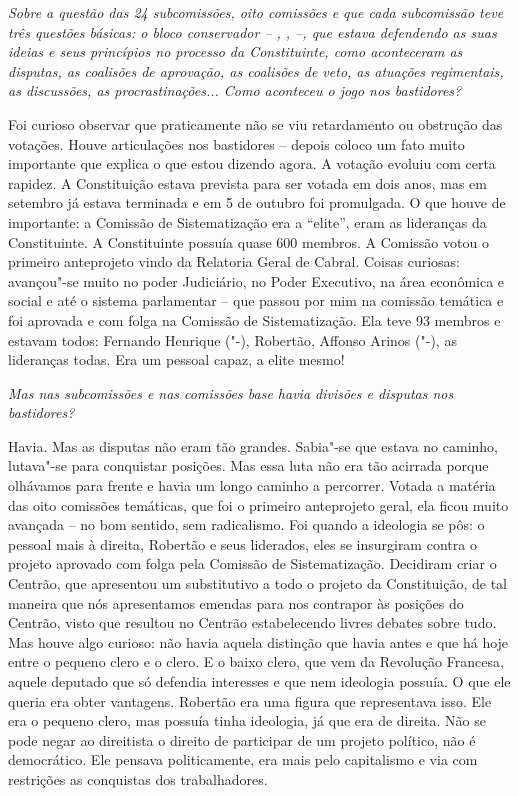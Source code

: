\medskip

\noindent\emph{Sobre a questão das 24 subcomissões, oito comissões e que cada
subcomissão teve três questões básicas: o bloco conservador -- , ,
 --, que estava defendendo as suas ideias e seus princípios no
processo da Constituinte, como aconteceram as disputas, as coalisões de
aprovação, as coalisões de veto, as atuações regimentais, as discussões,
as procrastinações... Como aconteceu o jogo nos bastidores?}

Foi curioso observar que praticamente não se viu
retardamento ou obstrução das votações. Houve articulações nos
bastidores -- depois coloco um fato muito importante que explica o que
estou dizendo agora. A votação evoluiu com certa rapidez. A Constituição
estava prevista para ser votada em dois anos, mas em setembro já estava
terminada e em 5 de outubro foi promulgada. O que houve de importante: a
Comissão de Sistematização era a ``elite'', eram as lideranças da
Constituinte. A Constituinte possuía quase 600 membros. A Comissão votou
o primeiro anteprojeto vindo da Relatoria Geral de Cabral. Coisas
curiosas: avançou"-se muito no poder Judiciário, no Poder Executivo, na
área econômica e social e até o sistema parlamentar -- que passou por
mim na comissão temática e foi aprovada e com folga na Comissão de
Sistematização. Ela teve 93 membros e estavam todos: Fernando Henrique
("-), Robertão, Affonso Arinos ("-), as lideranças todas. Era
um pessoal capaz, a elite mesmo!

\medskip

\noindent\emph{Mas nas subcomissões e nas comissões base havia divisões e
disputas nos bastidores?}

Havia. Mas as disputas não eram tão grandes. Sabia"-se
que estava no caminho, lutava"-se para conquistar posições. Mas essa luta
não era tão acirrada porque olhávamos para frente e havia um longo
caminho a percorrer. Votada a matéria das oito comissões temáticas, que
foi o primeiro anteprojeto geral, ela ficou muito avançada -- no bom
sentido, sem radicalismo. Foi quando a ideologia se pôs: o pessoal mais
à direita, Robertão e seus liderados, eles se insurgiram contra o
projeto aprovado com folga pela Comissão de Sistematização. Decidiram
criar o Centrão, que apresentou um substitutivo a todo o projeto da
Constituição, de tal maneira que nós apresentamos emendas para nos
contrapor às posições do Centrão, visto que resultou no Centrão
estabelecendo livres debates sobre tudo. Mas houve algo curioso: não
havia aquela distinção que havia antes e que há hoje entre o pequeno
clero e o clero. E o baixo clero, que vem da Revolução Francesa, aquele
deputado que só defendia interesses e que nem ideologia possuía. O que
ele queria era obter vantagens. Robertão era uma figura que representava
isso. Ele era o pequeno clero, mas possuía tinha ideologia, já que era
de direita. Não se pode negar ao direitista o direito de participar de
um projeto político, não é democrático. Ele pensava politicamente, era
mais pelo capitalismo e via com restrições as conquistas dos
trabalhadores.

